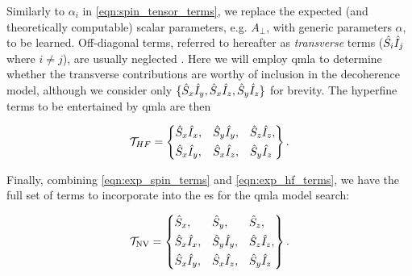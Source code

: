 Similarly to $\alpha_i$ in \cref{eqn:spin_tensor_terms}, we replace the expected (and theoretically computable)
    scalar parameters, e.g. $A_{\perp}$, with generic parameters $\alpha$, to be learned.
Off-diagonal terms, referred to hereafter as \emph{transverse} terms ($\hat{S_i}\hat{I}_j$ where $i\neq j$),
    are usually neglected \cite{blok2014manipulating}.
Here we will employ \gls{qmla} to determine whether the transverse contributions are worthy of inclusion in the decoherence model, 
    although we consider only $\{ \hat{S}_x\hat{I}_y, \hat{S}_x\hat{I}_z, \hat{S}_y\hat{I}_z\}$ for brevity. 
The hyperfine terms to be entertained by \gls{qmla} are then

\begin{equation}
    \mathcal{T}_{HF} = \left\{
    \begin{align}  
        \begin{split}
        & \hat{S}_x\hat{I}_x, && \hat{S}_y\hat{I}_y, && \hat{S}_z\hat{I}_z, \\
        & \hat{S}_x\hat{I}_y, && \hat{S}_x\hat{I}_z, && \hat{S}_y\hat{I}_z 
        \end{split}
    \end{align}
    \right\}.
    \label{eqn:exp_hf_terms}
\end{equation}

\par 

Finally, combining \cref{eqn:exp_spin_terms} and \cref{eqn:exp_hf_terms}, 
    we have the full set of terms to incorporate into the \gls{es} for the \gls{qmla} \gls{model search}: 

\begin{equation}
    \mathcal{T}_{\textrm{NV}} = \left\{
    \begin{align}
        & \hat{S}_x, && \hat{S}_y, && \hat{S}_z, \\
        & \hat{S}_x\hat{I}_x, && \hat{S}_y\hat{I}_y, && \hat{S}_z\hat{I}_z, \\
        & \hat{S}_x\hat{I}_y, && \hat{S}_x\hat{I}_z, && \hat{S}_y\hat{I}_z 
    \end{align}
    \right\}.
    \label{eqn:nv_terms_verbose}
\end{equation}
\par 

